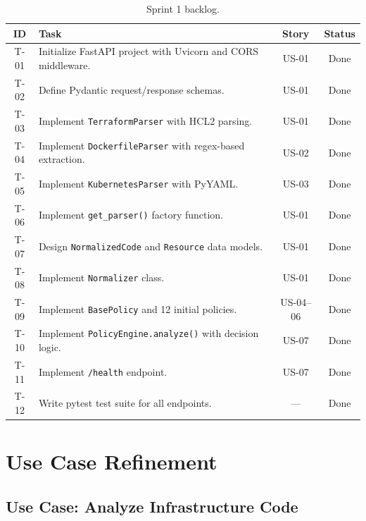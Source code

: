 \begin{table}[H]
\centering
\begin{tabularx}{\textwidth}{|c|X|c|c|}
\hline
\textbf{ID} & \textbf{Task} & \textbf{Story} & \textbf{Status} \\
\hline
T-01 & Initialize FastAPI project with Uvicorn and CORS middleware. & US-01 & Done \\
\hline
T-02 & Define Pydantic request/response schemas. & US-01 & Done \\
\hline
T-03 & Implement \texttt{TerraformParser} with HCL2 parsing. & US-01 & Done \\
\hline
T-04 & Implement \texttt{DockerfileParser} with regex-based extraction. & US-02 & Done \\
\hline
T-05 & Implement \texttt{KubernetesParser} with PyYAML. & US-03 & Done \\
\hline
T-06 & Implement \texttt{get\_parser()} factory function. & US-01 & Done \\
\hline
T-07 & Design \texttt{NormalizedCode} and \texttt{Resource} data models. & US-01 & Done \\
\hline
T-08 & Implement \texttt{Normalizer} class. & US-01 & Done \\
\hline
T-09 & Implement \texttt{BasePolicy} and 12 initial policies. & US-04--06 & Done \\
\hline
T-10 & Implement \texttt{PolicyEngine.analyze()} with decision logic. & US-07 & Done \\
\hline
T-11 & Implement \texttt{/health} endpoint. & US-07 & Done \\
\hline
T-12 & Write pytest test suite for all endpoints. & --- & Done \\
\hline
\end{tabularx}
\caption{Sprint 1 backlog.}
\label{tab:s1-backlog}
\end{table}


\section{Use Case Refinement}

\subsection{Use Case: Analyze Infrastructure Code}

